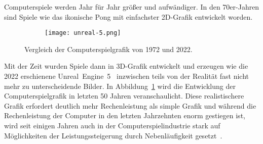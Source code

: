 
Computerspiele werden Jahr für Jahr größer und aufwändiger. In den 70er-Jahren sind Spiele wie das ikonische Pong mit einfachster 2D-Grafik entwickelt worden. 
\begin{figure}
	\begin{subfigure}[b]{.49\textwidth}
		\centering
		\tikzset{external/export next=false}
	\end{subfigure}
	\begin{subfigure}[b]{.49\textwidth}
		\centering
		\texttt{[image: unreal-5.png]}
	\end{subfigure}
	\caption{Vergleich der Computerspielgrafik von 1972 und 2022.}\label{fig:grafikvergleich}
\end{figure}
Mit der Zeit wurden Spiele dann in 3D-Grafik entwickelt und erzeugen wie die 2022 erschienene Unreal~Engine~5~\cite{EpicGamesInc.} inzwischen teils von der Realität fast nicht mehr zu unterscheidende Bilder. In Abbildung~\ref{fig:grafikvergleich} wird die Entwicklung der Computerspielgrafik in letzten 50 Jahren veranschaulicht. Diese realistischere Grafik erfordert deutlich mehr Rechenleistung als simple Grafik und während die Rechenleistung der Computer in den letzten Jahrzehnten enorm gestiegen ist, wird seit einigen Jahren auch in der Computerspielindustrie stark auf Möglichkeiten der Leistungssteigerung durch Nebenläufigkeit gesetzt~\cite{Tatarchuk2014,Genova2015,Gyrling2015,Schott2016,Hodgman2016,White2018}.

